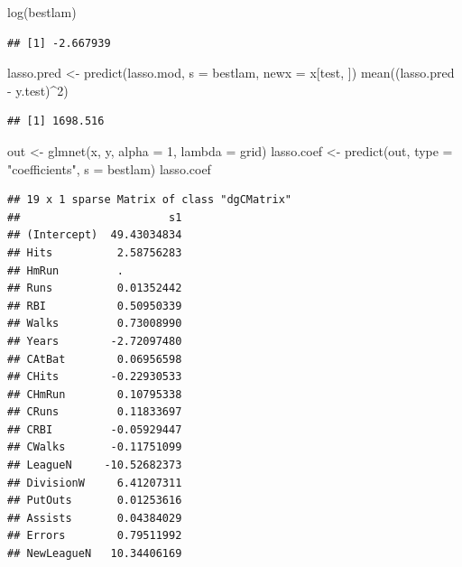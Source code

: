 \documentclass[
  12pt,
]{book}
\newenvironment{Shaded}{\begin{snugshade}}{\end{snugshade}}
\newcommand{\AttributeTok}[1]{\textcolor[rgb]{0.77,0.63,0.00}{#1}}
\newcommand{\DecValTok}[1]{\textcolor[rgb]{0.00,0.00,0.81}{#1}}
\newcommand{\FunctionTok}[1]{\textcolor[rgb]{0.00,0.00,0.00}{#1}}
\newcommand{\NormalTok}[1]{#1}
\newcommand{\OtherTok}[1]{\textcolor[rgb]{0.56,0.35,0.01}{#1}}
\newcommand{\SpecialCharTok}[1]{\textcolor[rgb]{0.00,0.00,0.00}{#1}}
\newcommand{\StringTok}[1]{\textcolor[rgb]{0.31,0.60,0.02}{#1}}
\theoremstyle{definition}
\theoremstyle{definition}
\theoremstyle{definition}
\theoremstyle{definition}
\theoremstyle{remark}
\begin{document}
\begin{Shaded}
\begin{Highlighting}[]
\FunctionTok{log}\NormalTok{(bestlam)}
\end{Highlighting}
\end{Shaded}

\begin{verbatim}
## [1] -2.667939
\end{verbatim}

\begin{Shaded}
\begin{Highlighting}[]
\NormalTok{lasso.pred }\OtherTok{\textless{}{-}} \FunctionTok{predict}\NormalTok{(lasso.mod, }\AttributeTok{s =}\NormalTok{ bestlam, }\AttributeTok{newx =}\NormalTok{ x[test,}
\NormalTok{    ])}
\FunctionTok{mean}\NormalTok{((lasso.pred }\SpecialCharTok{{-}}\NormalTok{ y.test)}\SpecialCharTok{\^{}}\DecValTok{2}\NormalTok{)}
\end{Highlighting}
\end{Shaded}

\begin{verbatim}
## [1] 1698.516
\end{verbatim}

\begin{Shaded}
\begin{Highlighting}[]
\NormalTok{out }\OtherTok{\textless{}{-}} \FunctionTok{glmnet}\NormalTok{(x, y, }\AttributeTok{alpha =} \DecValTok{1}\NormalTok{, }\AttributeTok{lambda =}\NormalTok{ grid)}
\NormalTok{lasso.coef }\OtherTok{\textless{}{-}} \FunctionTok{predict}\NormalTok{(out, }\AttributeTok{type =} \StringTok{"coefficients"}\NormalTok{, }\AttributeTok{s =}\NormalTok{ bestlam)}
\NormalTok{lasso.coef}
\end{Highlighting}
\end{Shaded}

\begin{verbatim}
## 19 x 1 sparse Matrix of class "dgCMatrix"
##                       s1
## (Intercept)  49.43034834
## Hits          2.58756283
## HmRun         .         
## Runs          0.01352442
## RBI           0.50950339
## Walks         0.73008990
## Years        -2.72097480
## CAtBat        0.06956598
## CHits        -0.22930533
## CHmRun        0.10795338
## CRuns         0.11833697
## CRBI         -0.05929447
## CWalks       -0.11751099
## LeagueN     -10.52682373
## DivisionW     6.41207311
## PutOuts       0.01253616
## Assists       0.04384029
## Errors        0.79511992
## NewLeagueN   10.34406169
\end{verbatim}
\end{document}
